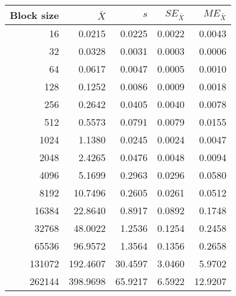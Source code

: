 \begin{tabular}{rrrrr}\toprule
{\small Block size} & $\bar{X}$ & $s$ & $SE_{\bar{X}}$ & $ME_{\bar{X}}$ \\\midrule
16 & 0.0215 & 0.0225 & 0.0022 & 0.0043\\
32 & 0.0328 & 0.0031 & 0.0003 & 0.0006\\
64 & 0.0617 & 0.0047 & 0.0005 & 0.0010\\
128 & 0.1252 & 0.0086 & 0.0009 & 0.0018\\
256 & 0.2642 & 0.0405 & 0.0040 & 0.0078\\
512 & 0.5573 & 0.0791 & 0.0079 & 0.0155\\
1024 & 1.1380 & 0.0245 & 0.0024 & 0.0047\\
2048 & 2.4265 & 0.0476 & 0.0048 & 0.0094\\
4096 & 5.1699 & 0.2963 & 0.0296 & 0.0580\\
8192 & 10.7496 & 0.2605 & 0.0261 & 0.0512\\
16384 & 22.8640 & 0.8917 & 0.0892 & 0.1748\\
32768 & 48.0022 & 1.2536 & 0.1254 & 0.2458\\
65536 & 96.9572 & 1.3564 & 0.1356 & 0.2658\\
131072 & 192.4607 & 30.4597 & 3.0460 & 5.9702\\
262144 & 398.9698 & 65.9217 & 6.5922 & 12.9207\\
\bottomrule
\end{tabular}
